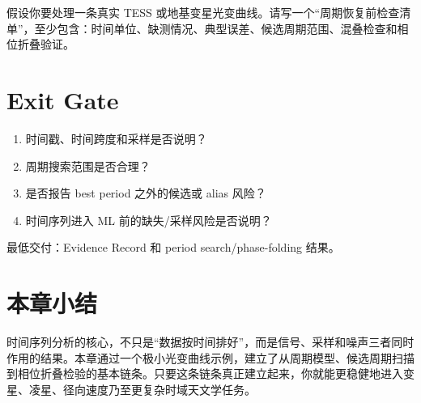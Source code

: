 \begin{exercisebox}[开放练习]
假设你要处理一条真实 TESS 或地基变星光变曲线。请写一个“周期恢复前检查清单”，至少包含：时间单位、缺测情况、典型误差、候选周期范围、混叠检查和相位折叠验证。
\end{exercisebox}

\section{Exit Gate}

\begin{enumerate}
    \item 时间戳、时间跨度和采样是否说明？
    \item 周期搜索范围是否合理？
    \item 是否报告 best period 之外的候选或 alias 风险？
    \item 时间序列进入 ML 前的缺失/采样风险是否说明？
\end{enumerate}

最低交付：Evidence Record 和 period search/phase-folding 结果。

\section{本章小结}

时间序列分析的核心，不只是“数据按时间排好”，而是信号、采样和噪声三者同时作用的结果。本章通过一个极小光变曲线示例，建立了从周期模型、候选周期扫描到相位折叠检验的基本链条。只要这条链条真正建立起来，你就能更稳健地进入变星、凌星、径向速度乃至更复杂时域天文学任务。

